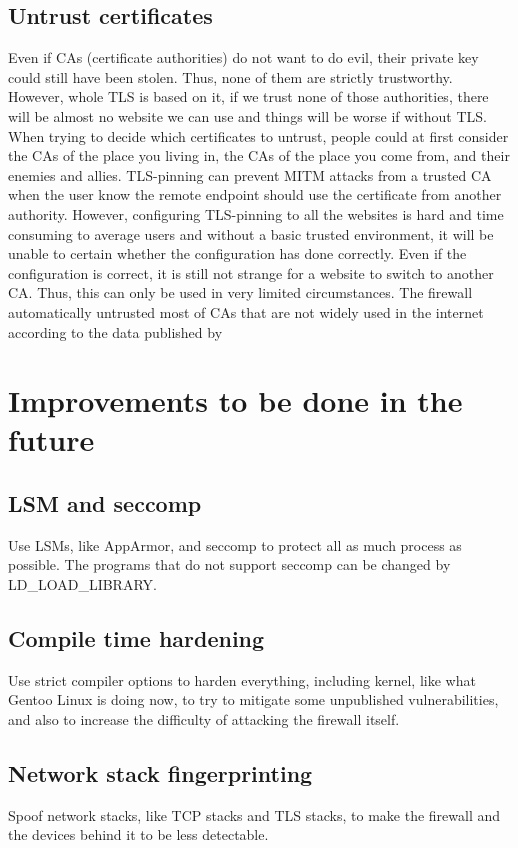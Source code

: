 \documentclass[mscthesis]{usiinfthesis}
\begin{document}
\section{Untrust certificates}

Even if CAs (certificate authorities) do not want to do evil, their private key could still have been stolen. Thus, none of them are strictly trustworthy. However, whole TLS is based on it, if we trust none of those authorities, there will be almost no website we can use and things will be worse if without TLS. When trying to decide which certificates to untrust, people could at first consider the CAs of the place you living in, the CAs of the place you come from, and their enemies and allies. TLS-pinning can prevent MITM attacks from a trusted CA when the user know the remote endpoint should use the certificate from another authority. However, configuring TLS-pinning to all the websites is hard and time consuming to average users and without a basic trusted environment, it will be unable to certain whether the configuration has done correctly. Even if the configuration is correct, it is still not strange for a website to switch to another CA. Thus, this can only be used in very limited circumstances. The firewall automatically untrusted most of CAs that are not widely used in the internet according to the data published by

\chapter{Improvements to be done in the future}

\section{LSM and seccomp}
Use LSMs, like AppArmor, and seccomp to protect all as much process as possible. The programs that do not support seccomp can be changed by LD\_LOAD\_LIBRARY.

\section{Compile time hardening}
Use strict compiler options to harden everything, including kernel, like what Gentoo Linux is doing now, to try to mitigate some unpublished vulnerabilities, and also to increase the difficulty of attacking the firewall itself.

\section{Network stack fingerprinting}
Spoof network stacks, like TCP stacks and TLS stacks, to make the firewall and the devices behind it to be less detectable.
\end{document}
